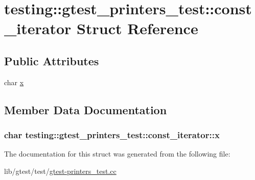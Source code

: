 \hypertarget{structtesting_1_1gtest__printers__test_1_1const__iterator}{\section{testing\-:\-:gtest\-\_\-printers\-\_\-test\-:\-:const\-\_\-iterator Struct Reference}
\label{structtesting_1_1gtest__printers__test_1_1const__iterator}
}
\subsection*{Public Attributes}
\begin{DoxyCompactItemize}
\item 
char \hyperlink{structtesting_1_1gtest__printers__test_1_1const__iterator_a4412dbc1c37c2bc5211971f0c8176d6b}{x}
\end{DoxyCompactItemize}


\subsection{Member Data Documentation}
\hypertarget{structtesting_1_1gtest__printers__test_1_1const__iterator_a4412dbc1c37c2bc5211971f0c8176d6b}{
\subsubsection[{x}]{\setlength{\rightskip}{0pt plus 5cm}char testing\-::gtest\-\_\-printers\-\_\-test\-::const\-\_\-iterator\-::x}}\label{structtesting_1_1gtest__printers__test_1_1const__iterator_a4412dbc1c37c2bc5211971f0c8176d6b}


The documentation for this struct was generated from the following file\-:\begin{DoxyCompactItemize}
\item 
lib/gtest/test/\hyperlink{gtest-printers__test_8cc}{gtest-\/printers\-\_\-test.\-cc}\end{DoxyCompactItemize}
